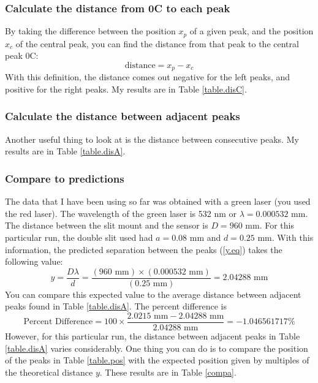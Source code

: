 \subsubsection{Calculate the distance from 0C to each peak}
By taking the difference between the position $x_{p}$ of a given peak, and the position $x_{c}$ of the central peak, you can find the distance from that peak to the central peak 0C:
\begin{equation}
	\text{distance} = x_{p} - x_{c}
\end{equation}
With this definition, the distance comes out negative for the left peaks, and positive for the right peaks. My results are in Table \ref{table.disC}.
\subsubsection{Calculate the distance between adjacent peaks}
Another useful thing to look at is the distance between consecutive peaks. My results are in Table \ref{table.disA}.
\subsubsection{Compare to predictions}
The data that I have been using so far was obtained with a green laser (you used the red laser). The wavelength of the green laser is 532 nm or $\lambda = 0.000532$ mm. The distance between the slit mount and the sensor is $D = 960$ mm. For this particular run, the double slit used had $a = 0.08$ mm and $d = 0.25$ mm. With this information, the predicted separation between the peaks (\ref{y.eq}) takes the following value:
\begin{equation}
	y = \frac{D \lambda}{d} = \frac{(960 \text{ mm}) \times (0.000532 \text{ mm})}{(0.25 \text{ mm})} = 2.04288 \text{ mm}
\end{equation}
You can compare this expected value to the average distance between adjacent peaks found in Table \ref{table.disA}. The percent difference is
\begin{equation}
	\text{Percent Difference} = 100 \times \frac{2.0215 \text{ mm} - 2.04288 \text{ mm}}{2.04288 \text{ mm}} = -1.046561717 \%
\end{equation}
However, for this particular run, the distance between adjacent peaks in Table \ref{table.disA} varies considerably. One thing you can do is to compare the position of the peaks in Table \ref{table.pos} with the expected position given by multiples of the theoretical distance $y$. These results are in Table \ref{compa}.
